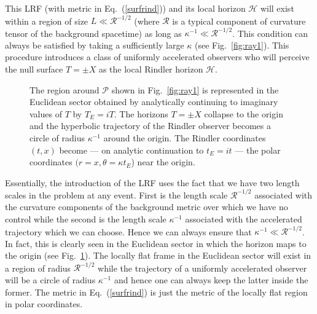 \documentclass[12pt]{iopart}
\def\eq#1{{Eq.~(\ref{#1})}}
\def\fig#1{{Fig.~\ref{#1}}}
\begin{document}
 This LRF (with  metric in \eq{surfrind}) and its local horizon $\mathcal{H}$ will exist within a region of size $L\ll\mathcal{R}^{-1/2}$ 
 (where $\mathcal{R}$ is a typical component of curvature tensor of the background spacetime) as long as $\kappa^{-1}\ll\mathcal{R}^{-1/2}$. This condition can always be satisfied by taking a sufficiently large $\kappa$ (see \fig{fig:ray1}). This procedure introduces a class of uniformly accelerated observers
 who will perceive the null surface $T=\pm X$ as the local Rindler horizon $\mathcal{H}$. 
 

 \begin{figure}
\begin{center}
\scalebox{0.25}{}\qquad\scalebox{0.25}{}
\end{center}
\caption{The left frame illustrates schematically the light rays near an event
$\mathcal{P}$ in the $\bar t - \bar x$ plane of an arbitrary spacetime. The right frame
shows the same neighbourhood of $\mathcal{P}$ in the locally inertial frame at $\mathcal{P}$
in Riemann normal coordinates $(T,X)$. The light rays now become 45 degree lines and the trajectory of the local Rindler observer becomes a hyperbola very close to $T=\pm X$ lines
which act as a local horizon to the Rindler observer.}
\label{fig:ray1}
\begin{center}
\scalebox{0.25}{}
\end{center}
\caption{The region around $\mathcal{P} $ shown in \fig{fig:ray1} is represented in the 
Euclidean sector obtained by analytically continuing to imaginary values of $T$ by $T_E = iT$. The horizons $T=\pm X$ collapse to the origin and the hyperbolic trajectory of the Rindler 
observer becomes a circle of radius $\kappa^{-1}$ around the origin. The Rindler coordinates
$(t,x)$ become --- on analytic continuation to $t_E = it$ --- the polar coordinates
$(r=x, \theta = \kappa t_E$) near the origin.}
\label{fig:ray3}
\end{figure}


 
  Essentially,  the introduction of the LRF uses  the fact that we have two length scales in the problem at any event. First is the length scale $\mathcal{R}^{-1/2}$ associated with the curvature components of the background metric over which we have no control while the second is the length scale $\kappa^{-1}$ associated with the accelerated trajectory which we can choose. Hence  we can always ensure that  $\kappa^{-1}\ll\mathcal{R}^{-1/2}$. In fact,  this
  is clearly seen in the  Euclidean sector in which the horizon maps to the origin (see \fig{fig:ray3}). The locally flat frame in the Euclidean sector will exist in a region of radius $\mathcal{R}^{-1/2}$ while the 
 trajectory of a uniformly accelerated observer will be a circle of radius $\kappa^{-1}$ and hence one  can always keep the latter inside the former. The metric in \eq{surfrind} is just the metric of the locally flat region in polar coordinates.
 
\end{document}

